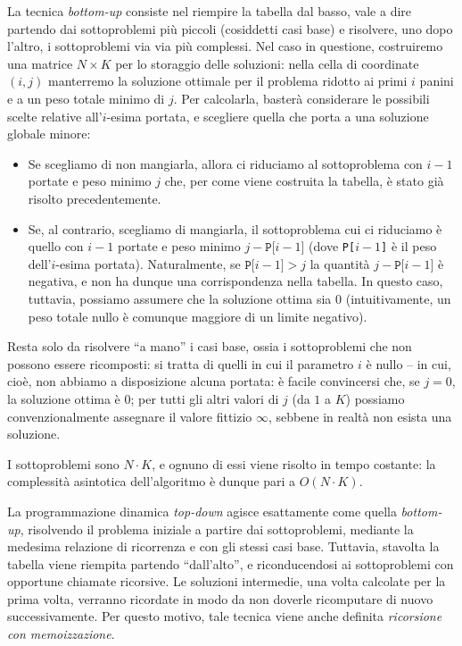     La tecnica \textit{bottom-up} consiste nel riempire la tabella dal basso, vale a dire partendo dai sottoproblemi più piccoli (cosiddetti casi base) e risolvere, uno dopo l'altro, i sottoproblemi via via più complessi. Nel caso in questione, costruiremo una matrice $N \times K$ per lo storaggio delle soluzioni: nella cella di coordinate $(i,j)$ manterremo la soluzione ottimale per il problema ridotto ai primi $i$ panini e a un peso totale minimo di $j$. Per calcolarla, basterà considerare le possibili scelte relative all'$i$-esima portata, e scegliere quella che porta a una soluzione globale minore:
    \begin{itemize}
    \item Se scegliamo di non mangiarla, allora ci riduciamo al sottoproblema con $i - 1$ portate e peso minimo $j$ che, per come viene costruita la tabella, è stato già risolto precedentemente.
    \item Se, al contrario, scegliamo di mangiarla, il sottoproblema cui ci riduciamo è quello con $i - 1$ portate e peso minimo $j - \texttt{P[$i - 1$]}$ (dove \texttt{P[$i - 1$]} è il peso dell'$i$-esima portata). Naturalmente, se $\texttt{P[$i - 1$]} > j$ la quantità $j - \texttt{P[$i - 1$]}$ è negativa, e non ha dunque una corrispondenza nella tabella. In questo caso, tuttavia, possiamo assumere che la soluzione ottima sia $0$ (intuitivamente, un peso totale nullo è comunque maggiore di un limite negativo).
    \end{itemize}
    
    Resta solo da risolvere ``a mano'' i casi base, ossia i sottoproblemi che non possono essere ricomposti: si tratta di quelli in cui il parametro $i$ è nullo -- in cui, cioè, non abbiamo a disposizione alcuna portata: è facile convincersi che, se $j = 0$, la soluzione ottima è $0$; per tutti gli altri valori di $j$ (da $1$ a $K$) possiamo convenzionalmente assegnare il valore fittizio $\infty$, sebbene in realtà non esista una soluzione.
    
    I sottoproblemi sono $N \cdot K$, e ognuno di essi viene risolto in tempo costante: la complessità asintotica dell'algoritmo è dunque pari a $O(N \cdot K)$.
    
    \TopDown
    
    La programmazione dinamica \textit{top-down} agisce esattamente come quella \textit{bottom-up}, risolvendo il problema iniziale a partire dai sottoproblemi, mediante la medesima relazione di ricorrenza e con gli stessi casi base. Tuttavia, stavolta la tabella viene riempita partendo ``dall'alto'', e riconducendosi ai sottoproblemi con opportune chiamate ricorsive. Le soluzioni intermedie, una volta calcolate per la prima volta, verranno ricordate in modo da non doverle ricomputare di nuovo successivamente. Per questo motivo, tale tecnica viene anche definita \textit{ricorsione con memoizzazione}.
    

